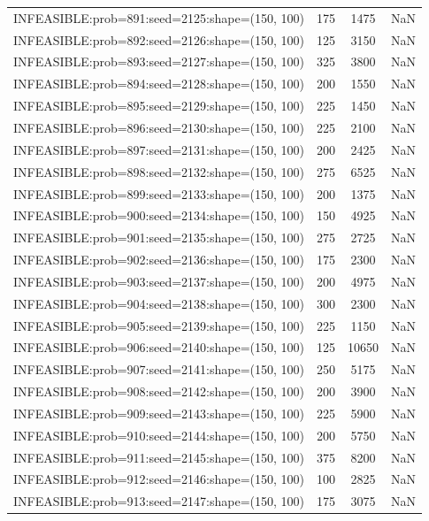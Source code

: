 \begin{longtable}{lccc}
INFEASIBLE:prob=891:seed=2125:shape=(150, 100) &      175 &  1475 &    NaN \\
INFEASIBLE:prob=892:seed=2126:shape=(150, 100) &      125 &  3150 &    NaN \\
INFEASIBLE:prob=893:seed=2127:shape=(150, 100) &      325 &  3800 &    NaN \\
INFEASIBLE:prob=894:seed=2128:shape=(150, 100) &      200 &  1550 &    NaN \\
INFEASIBLE:prob=895:seed=2129:shape=(150, 100) &      225 &  1450 &    NaN \\
INFEASIBLE:prob=896:seed=2130:shape=(150, 100) &      225 &  2100 &    NaN \\
INFEASIBLE:prob=897:seed=2131:shape=(150, 100) &      200 &  2425 &    NaN \\
INFEASIBLE:prob=898:seed=2132:shape=(150, 100) &      275 &  6525 &    NaN \\
INFEASIBLE:prob=899:seed=2133:shape=(150, 100) &      200 &  1375 &    NaN \\
INFEASIBLE:prob=900:seed=2134:shape=(150, 100) &      150 &  4925 &    NaN \\
INFEASIBLE:prob=901:seed=2135:shape=(150, 100) &      275 &  2725 &    NaN \\
INFEASIBLE:prob=902:seed=2136:shape=(150, 100) &      175 &  2300 &    NaN \\
INFEASIBLE:prob=903:seed=2137:shape=(150, 100) &      200 &  4975 &    NaN \\
INFEASIBLE:prob=904:seed=2138:shape=(150, 100) &      300 &  2300 &    NaN \\
INFEASIBLE:prob=905:seed=2139:shape=(150, 100) &      225 &  1150 &    NaN \\
INFEASIBLE:prob=906:seed=2140:shape=(150, 100) &      125 & 10650 &    NaN \\
INFEASIBLE:prob=907:seed=2141:shape=(150, 100) &      250 &  5175 &    NaN \\
INFEASIBLE:prob=908:seed=2142:shape=(150, 100) &      200 &  3900 &    NaN \\
INFEASIBLE:prob=909:seed=2143:shape=(150, 100) &      225 &  5900 &    NaN \\
INFEASIBLE:prob=910:seed=2144:shape=(150, 100) &      200 &  5750 &    NaN \\
INFEASIBLE:prob=911:seed=2145:shape=(150, 100) &      375 &  8200 &    NaN \\
INFEASIBLE:prob=912:seed=2146:shape=(150, 100) &      100 &  2825 &    NaN \\
INFEASIBLE:prob=913:seed=2147:shape=(150, 100) &      175 &  3075 &    NaN \\

\end{longtable}
